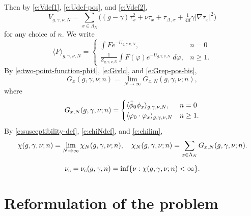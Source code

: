 Then by \eqref{e:Vdef1}, \eqref{e:Udef-pos}, and \eqref{e:Vdef2},
\begin{equation}
V_{g,\gamma,\nu,N}
	=
\sum_{x\in\Lambda_N}
\Big(
	(g - \gamma) \tau_x^2 + \nu \tau_x + \tau_{\Delta,x} + \tfrac{1}{4 d} \gamma |\nabla\tau_x|^2
\Big)
\end{equation}
for any choice of $n$.
We write
\begin{equation}
\langle F \rangle_{g,\gamma,\nu,N}
	=
\begin{cases}
\displaystyle \int F e^{-U_{g,\gamma,\nu,N}},           & n = 0 \\
\displaystyle \frac{1}{Z_{g,\gamma,\nu,N}}
	\int F(\varphi) e^{-U_{g,\gamma,\nu,N}} \; d\varphi,  & n \ge 1.
\end{cases}
\end{equation}
By \eqref{e:two-point-function-phi4}, \eqref{e:Givlc}, and \eqref{e:Grep-pos-bis},
\begin{equation}
G_x(g, \gamma, \nu; n) = \lim_{N\to\infty} G_{x,N}(g, \gamma, \nu; n),
\end{equation}
where
\begin{equation}
G_{x,N}(g, \gamma, \nu; n)
	=
\begin{cases}
\langle \bar\phi_0 \phi_x \rangle_{g,\gamma,\nu,N},      & n = 0 \\
\langle \varphi_0 \cdot \varphi_x \rangle_{g,\gamma,\nu,N}  & n \ge 1.
\end{cases}
\end{equation}
By \eqref{e:susceptibility-def}, \eqref{e:chiNdef}, and \eqref{e:chilim},
\begin{equation}
\chi(g, \gamma, \nu; n)
	=
\lim_{N\rightarrow\infty} \chi_N(g, \gamma, \nu; n),
	\quad
\chi_N(g, \gamma, \nu; n)
	=
\sum_{x\in\Lambda_N} G_{x,N}(g, \gamma, \nu; n).
\end{equation}

\begin{equation}
\label{e:nuc-def}
\nu_c = \nu_c(g, \gamma, n) = \inf \{ \nu : \chi(g, \gamma, \nu; n) < \infty \}.
\end{equation}


\section{Reformulation of the problem}

